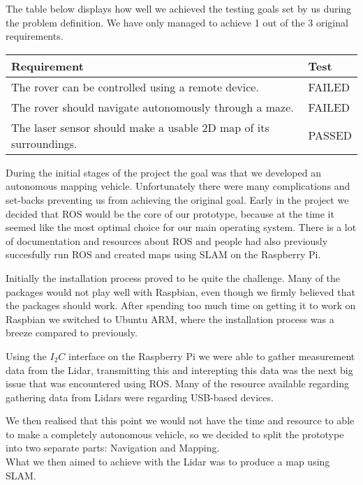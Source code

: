 The table below displays how well we achieved the testing goals set by us during the problem definition. We have only managed to achieve 1 out of the 3 original requirements.

\begin{table}[H]
	\centering
	\begin{tabular}{|l|l|}
		\hline
		\textbf{Requirement} & \textbf{Test} \\ \hline
		The rover can be controlled using a remote device. & FAILED \\ \hline
		The rover should navigate autonomously through a maze. & FAILED \\ \hline
		The laser sensor should make a usable 2D map of its surroundings. & PASSED\\ \hline
	\end{tabular}
\end{table}

During the initial stages of the project the goal was that we developed an autonomous mapping vehicle. Unfortunately there were many complications and set-backs preventing us from achieving the original goal. 
Early in the project we decided that ROS would be the core of our prototype, because at the time it seemed like the most optimal choice for our main operating system. There is a lot of documentation and resources about ROS and people had also previously succesfully run ROS and created maps using SLAM on the Raspberry Pi.

Initially the installation process proved to be quite the challenge. Many of the packages would not play well with Raspbian, even though we firmly believed that the packages should work. After spending too much time on getting it to work on Raspbian we switched to Ubuntu ARM, where the installation process was a breeze compared to previously.

Using the $I_2C$ interface on the Raspberry Pi we were able to gather measurement data from the Lidar, transmitting this and interepting this data was the next big issue that was encountered using ROS. Many of the resource available regarding gathering data from Lidars were regarding USB-based devices. %


We then realised that this point we would not have the time and resource to able to make a completely autonomous vehicle, so we decided to split the prototype into two separate parts: Navigation and Mapping.\\
What we then aimed to achieve with the Lidar was to produce a map using SLAM. %

